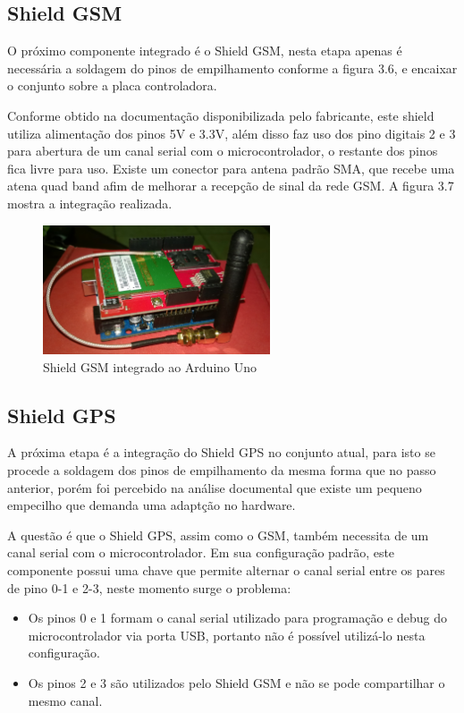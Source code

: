 \subsection{Shield GSM}

O próximo componente integrado é o Shield GSM, nesta etapa apenas é necessária a soldagem do pinos de empilhamento conforme a figura 3.6, e encaixar o conjunto sobre a placa controladora.

Conforme obtido na documentação disponibilizada pelo fabricante, este shield utiliza alimentação dos pinos 5V e 3.3V, além disso faz uso dos pino digitais 2 e 3 para abertura de um canal serial com o microcontrolador, o restante dos pinos fica livre para uso. Existe um conector para antena padrão SMA, que recebe uma atena quad band afim de melhorar a recepção de sinal da rede GSM. A figura 3.7 mostra a integração realizada.
 
\begin{figure}[!htb]
\centering
\includegraphics[width=0.6\textwidth]{figures/arduinoAndGSM.jpg}
\caption{Shield GSM integrado ao Arduino Uno}
\label{1}
\end{figure}

\subsection{Shield GPS}

A próxima etapa é a integração do Shield GPS no conjunto atual, para isto se procede a soldagem dos pinos de empilhamento da mesma forma que no passo anterior, porém foi percebido na análise documental que existe um pequeno empecilho que demanda uma adaptção no hardware.

A questão é que o Shield GPS, assim como o GSM, também necessita de um canal serial com o microcontrolador. Em sua configuração padrão, este componente possui uma chave que permite alternar o canal serial entre os pares de pino 0-1 e 2-3, neste momento surge o problema:

\begin{itemize}
	\item Os pinos 0 e 1 formam o canal serial utilizado para programação e debug do microcontrolador via porta USB, portanto não é possível utilizá-lo nesta configuração.
	\item Os pinos 2 e 3 são utilizados pelo Shield GSM e não se pode compartilhar o mesmo canal.
\end{itemize}

